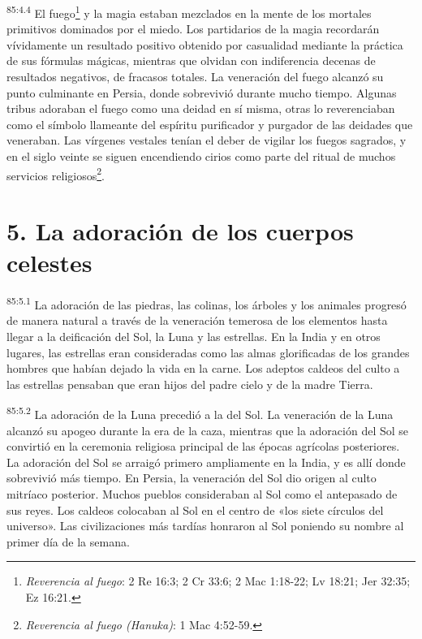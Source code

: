 \par
\textsuperscript{85:4.4} El fuego\footnote{\textit{Reverencia al fuego}: 2 Re 16:3; 2 Cr 33:6; 2 Mac 1:18-22; Lv 18:21; Jer 32:35; Ez 16:21.} y la magia estaban mezclados en la mente de los mortales primitivos dominados por el miedo. Los partidarios de la magia recordarán vívidamente un resultado positivo obtenido por casualidad mediante la práctica de sus fórmulas mágicas, mientras que olvidan con indiferencia decenas de resultados negativos, de fracasos totales. La veneración del fuego alcanzó su punto culminante en Persia, donde sobrevivió durante mucho tiempo. Algunas tribus adoraban el fuego como una deidad en sí misma, otras lo reverenciaban como el símbolo llameante del espíritu purificador y purgador de las deidades que veneraban. Las vírgenes vestales tenían el deber de vigilar los fuegos sagrados, y en el siglo veinte se siguen encendiendo cirios como parte del ritual de muchos servicios religiosos\footnote{\textit{Reverencia al fuego (Hanuka)}: 1 Mac 4:52-59.}.

\section*{5. La adoración de los cuerpos celestes}
\par
\textsuperscript{85:5.1} La adoración de las piedras, las colinas, los árboles y los animales progresó de manera natural a través de la veneración temerosa de los elementos hasta llegar a la deificación del Sol, la Luna y las estrellas. En la India y en otros lugares, las estrellas eran consideradas como las almas glorificadas de los grandes hombres que habían dejado la vida en la carne. Los adeptos caldeos del culto a las estrellas pensaban que eran hijos del padre cielo y de la madre Tierra.

\par
\textsuperscript{85:5.2} La adoración de la Luna precedió a la del Sol. La veneración de la Luna alcanzó su apogeo durante la era de la caza, mientras que la adoración del Sol se convirtió en la ceremonia religiosa principal de las épocas agrícolas posteriores. La adoración del Sol se arraigó primero ampliamente en la India, y es allí donde sobrevivió más tiempo. En Persia, la veneración del Sol dio origen al culto mitríaco posterior. Muchos pueblos consideraban al Sol como el antepasado de sus reyes. Los caldeos colocaban al Sol en el centro de «los siete círculos del universo». Las civilizaciones más tardías honraron al Sol poniendo su nombre al primer día de la semana.

